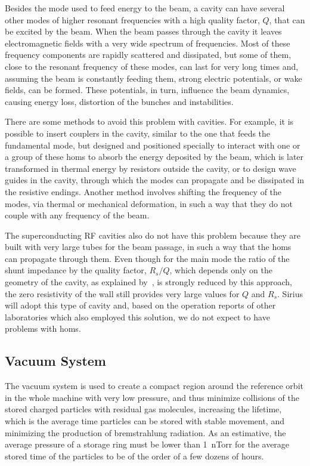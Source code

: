     Besides the mode used to feed energy to the beam, a cavity can have several other modes of higher resonant frequencies with a high quality factor, $Q$, that can be excited by the beam. When the beam passes through the cavity it leaves electromagnetic fields with a very wide spectrum of frequencies. Most of these frequency components are rapidly scattered and dissipated, but some of them, close to the resonant frequency of these modes, can last for very long times and, assuming the beam is constantly feeding them, strong electric potentials, or wake fields, can be formed. These potentials, in turn, influence the beam dynamics, causing energy loss, distortion of the bunches and instabilities.

    There are some methods to avoid this problem with cavities. For example, it is possible to insert couplers in the cavity, similar to the one that feeds the fundamental mode, but designed and positioned specially to interact with one or a group of these \glspl{hom} to absorb the energy deposited by the beam, which is later transformed in thermal energy by resistors outside the cavity, or to design wave guides in the cavity, through which the modes can propagate and be dissipated in the resistive endings. Another method involves shifting the frequency of the modes, via thermal or mechanical deformation, in such a way that they do not couple with any frequency of the beam.

    The superconducting RF cavities also do not have this problem because they are built with very large tubes for the beam passage, in such a way that the \glspl{hom} can propagate through them. Even though for the main mode the ratio of the shunt impedance by the quality factor, $R_s/Q$, which depends only on the geometry of the cavity, as explained by~, is strongly reduced by this approach, the zero resistivity of the wall still provides very large values for $Q$ and $R_s$. Sirius will adopt this type of cavity and, based on the operation reports of other laboratories which also employed this solution, we do not expect to have problems with \glspl{hom}.

\subsection{Vacuum System}

    The vacuum system is used to create a compact region around the reference orbit in the whole machine with very low pressure, and thus minimize collisions of the stored charged particles with residual gas molecules, increasing the lifetime, which is the average time particles can be stored with stable movement, and minimizing the production of bremstrahlung radiation. As an estimative, the average pressure of a storage ring must be lower than \SI{1}{\nano Torr} for the average stored time of the particles to be of the order of a few dozens of hours.

